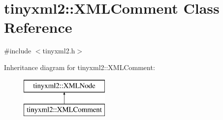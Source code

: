\hypertarget{classtinyxml2_1_1_x_m_l_comment}{}\section{tinyxml2\+:\+:X\+M\+L\+Comment Class Reference}
\label{classtinyxml2_1_1_x_m_l_comment}


{\ttfamily \#include $<$tinyxml2.\+h$>$}

Inheritance diagram for tinyxml2\+:\+:X\+M\+L\+Comment\+:\begin{figure}[H]
\begin{center}
\leavevmode
\includegraphics[height=2.000000cm]{classtinyxml2_1_1_x_m_l_comment}
\end{center}
\end{figure}
